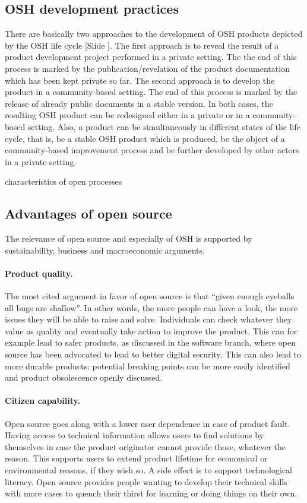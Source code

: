 \documentclass{article}
\newcounter{slide}
\begin{document}
\subsection{OSH development practices}
\label{sec:dvppractices}

There are basically two approaches to the development of OSH products depicted by the OSH life cycle {\color{blue}[Slide ]}. The first approach is to reveal the result of a product development project performed in a private setting. The the end of this process is marked by the publication/revelation of the product documentation which has been kept private so far. The second approach is to develop the product in a community-based setting. The end of this process is marked by the release of already public documents in a stable version. In both cases, the resulting OSH product can be redesigned either in a private or in a community-based setting. Also, a product can be simultaneously in different states of the life cycle, that is, be a stable OSH product which is produced, be the object of a community-based improvement process and be further developed by other actors in a private setting.

{\color{red}characteristics of open processes}

\subsection{Advantages of open source}
\label{sec:advantages}
The relevance of open source and especially of OSH is supported by sustainability, business and macroeconomic arguments.

\paragraph{Product quality.} The most cited argument in favor of open source is that ``given enough eyeballs all bugs are shallow''. In other words, the more people can have a look, the more issues they will be able to raise and solve. Individuals can check whatever they value as quality and eventually take action to improve the product. This can for example lead to safer products, as discussed in the software branch, where open source has been advocated to lead to better digital security. This can also lead to more durable products: potential breaking points can be more easily identified and product obsolescence openly discussed.

\paragraph{Citizen capability.} Open source goes along with a lower user dependence in case of product fault. Having access to technical information allows users to find solutions by themselves in case the product originator cannot provide those, whatever the reason. This supports users to extend product lifetime for economical or environmental reasons, if they wish so. A side effect is to support technological literacy. Open source provides people wanting to develop their technical skills with more cases to quench their thirst for learning or doing things on their own.
\end{document}
